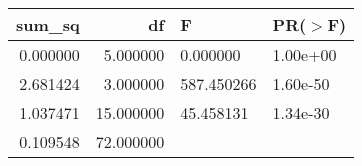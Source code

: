 \begin{tabular}{rrll}
\toprule
sum\_sq & df & F & PR($>$F) \\
\midrule
0.000000 & 5.000000 & 0.000000 & 1.00e+00 \\
2.681424 & 3.000000 & 587.450266 & 1.60e-50 \\
1.037471 & 15.000000 & 45.458131 & 1.34e-30 \\
0.109548 & 72.000000 &  &  \\
\bottomrule
\end{tabular}
